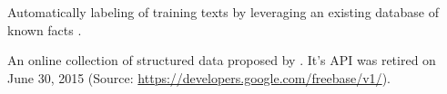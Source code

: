 
{%
  Automatically labeling of training texts by leveraging an existing database of known facts \cite{reschke2014event}.
}

{%
  An online collection of structured data proposed by \citep{bollacker2008freebase}.
  It's API was retired on June 30, 2015 (Source: \url{https://developers.google.com/freebase/v1/}).
}


